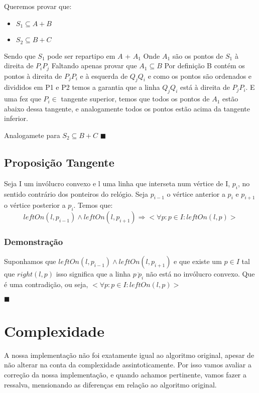 \documentclass[11pt]{article}
\begin{document}
Queremos provar que:
\begin{itemize}
    \item $S_1 \subseteq A + B$
    \item $S_2 \subseteq B + C$
\end{itemize}

Sendo que $S_1$ pode ser repartipo em $A$ + $A_1$
\newline
Onde $A_1$ são os pontos de $S_1$ à direita de $P_iP_j$
\newline
Faltando apenas provar que $A_1 \subseteq B$ 
Por definição B contém os pontos à direita de $P_jP_i$ e à esquerda
de $Q_jQ_i$ e como os pontos são ordenados e divididos em P1 e P2
temos a garantia que a linha $Q_jQ_i$ está à direita de $P_jP_i$.
E uma fez que $P_i \in$ tangente superior, temos que todos os pontos
de $A_1$ estão abaixo dessa tangente, e analogamente todos os pontos
estão acima da tangente inferior.


Analogamete para $S_2 \subseteq B + C$
\hfill $\blacksquare$

\subsection{Proposição Tangente}
Seja 
    I um invólucro convexo e 
    l uma linha que interseta num vértice de I, $p_i$,
no sentido contrário dos ponteiros do relógio.
Seja $p_{i-1}$ o vértice anterior a $p_i$ e $p_{i+1}$ o vértice posterior a $p_i$.
Temos que:
$$leftOn(l, p_{i-1}) \wedge leftOn(l, p_{i+1}) \Rightarrow
    <\forall p : p \in I : leftOn(l, p)>$$

\subsubsection{Demonstração}
Suponhamos que $leftOn(l, p_{i-1}) \wedge leftOn(l, p_{i+1})$ 
e que existe um $p \in I$ tal que $right(l, p)$
isso significa que a linha $\overline{p\ p_i}$ não está no invólucro convexo.
Que é uma contradição, ou seja, $<\forall p : p \in I : leftOn(l, p)>$

\hfill $\blacksquare$


\section{Complexidade}
A nossa implementação não foi exatamente igual ao algoritmo original,
apesar de não alterar na conta da complexidade assintoticamente.
Por isso vamos avaliar a correção da nossa implementação, e quando 
achamos pertinente, vamos fazer a ressalva, mensionando as diferenças 
em relação ao algoritmo original.
\end{document}
